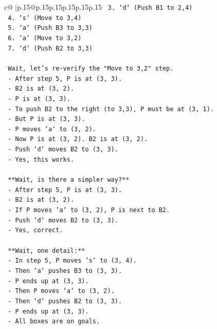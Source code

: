 \documentclass{article}
\begin{document}
{\begin{supertabular}{c@{$\;$}|p{.15\linewidth}@{}p{.15\linewidth}p{.15\linewidth}p{.15\linewidth}p{.15\linewidth}p{.15\linewidth}}
{{{\texttt{    3. `d` (Push B1 to 2,4)} \\
\texttt{    4. `s` (Move to 3,4)} \\
\texttt{    5. `a` (Push B3 to 3,3)} \\
\texttt{    6. `a` (Move to 3,2)} \\
\texttt{    7. `d` (Push B2 to 3,3)} \\
\\ 
\texttt{    Wait, let's re{-}verify the "Move to 3,2" step.} \\
\texttt{    {-} After step 5, P is at (3, 3).} \\
\texttt{    {-} B2 is at (3, 2).} \\
\texttt{    {-} P is at (3, 3).} \\
\texttt{    {-} To push B2 to the right (to 3,3), P must be at (3, 1).} \\
\texttt{    {-} But P is at (3, 3).} \\
\texttt{    {-} P moves `a` to (3, 2).} \\
\texttt{    {-} Now P is at (3, 2). B2 is at (3, 2).} \\
\texttt{    {-} Push `d` moves B2 to (3, 3).} \\
\texttt{    {-} Yes, this works.} \\
\\ 
\texttt{    **Wait, is there a simpler way?**} \\
\texttt{    {-} After step 5, P is at (3, 3).} \\
\texttt{    {-} B2 is at (3, 2).} \\
\texttt{    {-} If P moves `a` to (3, 2), P is next to B2.} \\
\texttt{    {-} Push `d` moves B2 to (3, 3).} \\
\texttt{    {-} Yes, correct.} \\
\\ 
\texttt{    **Wait, one detail:**} \\
\texttt{    {-} In step 5, P moves `s` to (3, 4).} \\
\texttt{    {-} Then `a` pushes B3 to (3, 3).} \\
\texttt{    {-} P ends up at (3, 3).} \\
\texttt{    {-} Then P moves `a` to (3, 2).} \\
\texttt{    {-} Then `d` pushes B2 to (3, 3).} \\
\texttt{    {-} P ends up at (3, 3).} \\
\texttt{    {-} All boxes are on goals.} \\
}}}
\end{supertabular}}
\end{document}
